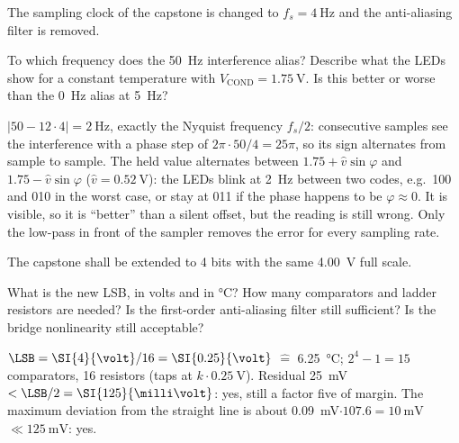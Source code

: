 The sampling clock of the capstone is changed to $f_s = \SI{4}{\hertz}$
and the anti-aliasing filter is removed.
\begin{talist}
\ta To which frequency does the \SI{50}{\hertz} interference alias?
\ta Describe what the LEDs show for a constant temperature with
	$V_\mathrm{COND}=\SI{1.75}{\volt}$.
\ta Is this better or worse than the \SI{0}{\hertz} alias at \SI{5}{\hertz}?
\end{talist}

\begin{solution}
\begin{talist}
\ta $|50 - 12\cdot 4| = \SI{2}{\hertz}$, exactly the Nyquist frequency
	$f_s/2$: consecutive samples see the interference with a phase step of
	$2\pi\cdot 50/4 = 25\pi$, so its sign alternates from sample to sample.
\ta The held value alternates between $1.75 + \hat v\sin\varphi$ and
	$1.75 - \hat v\sin\varphi$ ($\hat v = \SI{0.52}{\volt}$): the LEDs
	blink at \SI{2}{\hertz} between two codes, e.g.\ 100 and 010 in the
	worst case, or stay at 011 if the phase happens to be $\varphi \approx 0$.
\ta It is visible, so it is ``better'' than a silent offset, but the
	reading is still wrong. Only the low-pass in front of the sampler
	removes the error for every sampling rate.
\end{talist}
\end{solution}

The capstone shall be extended to 4 bits with the same \SI{4.00}{\volt}
full scale.
\begin{talist}
\ta What is the new LSB, in volts and in \si{\celsius}? How many
	comparators and ladder resistors are needed?
\ta Is the first-order anti-aliasing filter still sufficient?
\ta Is the bridge nonlinearity still acceptable?
\end{talist}

\begin{solution}
\begin{talist}
\ta $\LSB = \SI{4}{\volt}/16 = \SI{0.25}{\volt}$ $\widehat{=}$
	\SI{6.25}{\celsius}; $2^4-1 = 15$ comparators, 16 resistors (taps at
	$k\cdot\SI{0.25}{\volt}$).
\ta Residual \SI{25}{\milli\volt} $< \LSB/2 = \SI{125}{\milli\volt}$: yes,
	still a factor five of margin.
\ta The maximum deviation from the straight line is about
	\SI{0.09}{\milli\volt}$\cdot 107.6 = \SI{10}{\milli\volt}$
	$\ll \SI{125}{\milli\volt}$: yes.
\end{talist}
\end{solution}

